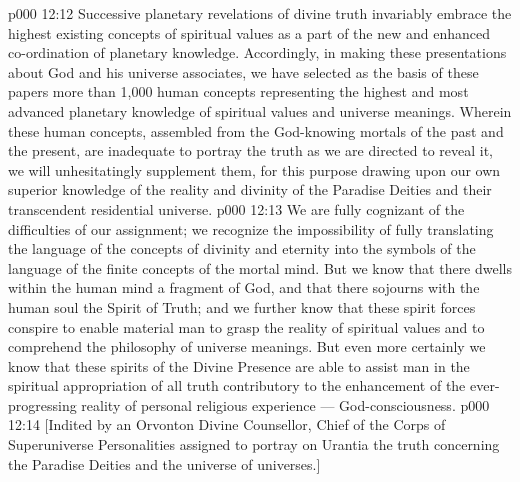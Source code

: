 \vs p000 12:12 Successive planetary revelations of divine truth invariably embrace the highest existing concepts of spiritual values as a part of the new and enhanced co\hyp{}ordination of planetary knowledge. Accordingly, in making these presentations about God and his universe associates, we have selected as the basis of these papers more than 1,000 human concepts representing the highest and most advanced planetary knowledge of spiritual values and universe meanings. Wherein these human concepts, assembled from the God\hyp{}knowing mortals of the past and the present, are inadequate to portray the truth as we are directed to reveal it, we will unhesitatingly supplement them, for this purpose drawing upon our own superior knowledge of the reality and divinity of the Paradise Deities and their transcendent residential universe.
\vs p000 12:13 We are fully cognizant of the difficulties of our assignment; we recognize the impossibility of fully translating the language of the concepts of divinity and eternity into the symbols of the language of the finite concepts of the mortal mind. But we know that there dwells within the human mind a fragment of God, and that there sojourns with the human soul the Spirit of Truth; and we further know that these spirit forces conspire to enable material man to grasp the reality of spiritual values and to comprehend the philosophy of universe meanings. But even more certainly we know that these spirits of the Divine Presence are able to assist man in the spiritual appropriation of all truth contributory to the enhancement of the ever\hyp{}progressing reality of personal religious experience --- God\hyp{}consciousness.
\vsetoff
\vs p000 12:14 [Indited by an Orvonton Divine Counsellor, Chief of the Corps of Superuniverse Personalities assigned to portray on Urantia the truth concerning the Paradise Deities and the universe of universes.]
\quizlink
